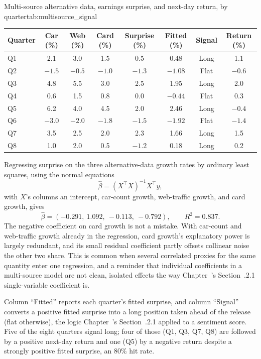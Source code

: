 \documentclass[../ai_in_finance]{subfiles}
\begin{document}
\begin{booktable}[htbp]{Multi-source alternative data, earnings surprise, and next-day return, by quarter}{tab:multisource_signal}
\small
\begin{tabular}{lccccccc}
\toprule
Quarter & Car (\%) & Web (\%) & Card (\%) & Surprise (\%) & Fitted (\%) & Signal & Return (\%) \\
\midrule
Q1 & 2.1 & 3.0 & 1.5 & 0.5 & 0.48 & Long & 1.1 \\
Q2 & $-1.5$ & $-0.5$ & $-1.0$ & $-1.3$ & $-1.08$ & Flat & $-0.6$ \\
Q3 & 4.8 & 5.5 & 3.0 & 2.5 & 1.95 & Long & 2.0 \\
Q4 & 0.6 & 1.5 & 0.8 & 0.0 & $-0.44$ & Flat & 0.3 \\
Q5 & 6.2 & 4.0 & 4.5 & 2.0 & 2.46 & Long & $-0.4$ \\
Q6 & $-3.0$ & $-2.0$ & $-1.8$ & $-1.5$ & $-1.92$ & Flat & $-1.4$ \\
Q7 & 3.5 & 2.5 & 2.0 & 2.3 & 1.66 & Long & 1.5 \\
Q8 & 1.0 & 2.0 & 0.5 & $-1.2$ & 0.18 & Long & 0.2 \\
\bottomrule
\end{tabular}
\end{booktable}

Regressing surprise on the three alternative-data growth rates by ordinary least squares, using the normal equations
\begin{equation}
\hat\beta = (X^\top X)^{-1}X^\top y,
\label{eq:altdata-ols}
\end{equation}
with $X$'s columns an intercept, car-count growth, web-traffic growth, and card growth, gives
\begin{equation*}
\hat\beta = (-0.291,\ 1.092,\ -0.113,\ -0.792), \qquad R^2 = 0.837.
\end{equation*}
The negative coefficient on card growth is not a mistake. With car-count and web-traffic growth already in the regression, card growth's explanatory power is largely redundant, and its small residual coefficient partly offsets collinear noise the other two share. This is common when several correlated proxies for the same quantity enter one regression, and a reminder that individual coefficients in a multi-source model are not clean, isolated effects the way Chapter~'s Section~.2.1 single-variable coefficient is.

Column ``Fitted'' reports each quarter's fitted surprise, and column ``Signal'' converts a positive fitted surprise into a long position taken ahead of the release (flat otherwise), the logic Chapter~'s Section~.2.1 applied to a sentiment score. Five of the eight quarters signal long; four of those (Q1, Q3, Q7, Q8) are followed by a positive next-day return and one (Q5) by a negative return despite a strongly positive fitted surprise, an 80\% hit rate.
\end{document}
